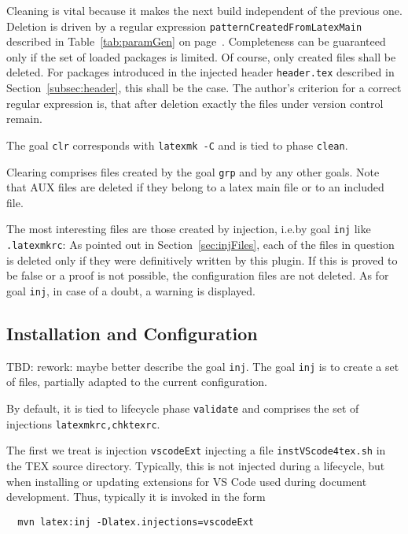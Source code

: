 Cleaning is vital because it makes the next build independent of the previous one. 
Deletion is driven by a regular expression \texttt{patternCreatedFromLatexMain} 
described in Table~\ref{tab:paramGen} on page~\pageref{tab:paramGen}. 
Completeness can be guaranteed only 
if the set of loaded packages is limited. 
Of course, only created files shall be deleted. 
For packages introduced in the injected header \texttt{header.tex} 
described in Section~\ref{subsec:header}, this shall be the case. 
The author's criterion for a correct regular expression is, 
that after deletion exactly the files under version control remain. 

The goal \texttt{clr} corresponds with \texttt{latexmk -C} and is tied to phase \texttt{clean}. 

Clearing comprises files created by the goal \texttt{grp} and by any other goals. 
Note that AUX files are deleted if they belong to a latex main file or to an included file. 

The most interesting files are those created by injection, 
i.e.\@ by goal \texttt{inj} like \texttt{.latexmkrc}: 
As pointed out in Section~\ref{sec:injFiles}, 
each of the files in question is deleted only 
if they were definitively written by this plugin. 
If this is proved to be false or a proof is not possible, 
the configuration files are not deleted. 
As for goal \texttt{inj}, in case of a doubt, a warning is displayed. 



\subsection{Installation and Configuration}\label{subsec:develConfig}

TBD\@: rework: maybe better describe the goal \texttt{inj}. 
The goal \texttt{inj} is to create a set of files, 
partially adapted to the current configuration. 



By default, it is tied to lifecycle phase \texttt{validate} 
and comprises the set of injections \texttt{latexmkrc,chktexrc}. 

The first we treat is injection \texttt{vscodeExt} 
injecting a file \texttt{instVScode4tex.sh} in the TEX source directory. 
Typically, this is not injected during a lifecycle, 
but when installing or updating extensions for VS Code 
used during document development. 
Thus, typically it is invoked in the form 
%
\begin{verbatim}
  mvn latex:inj -Dlatex.injections=vscodeExt
\end{verbatim}

